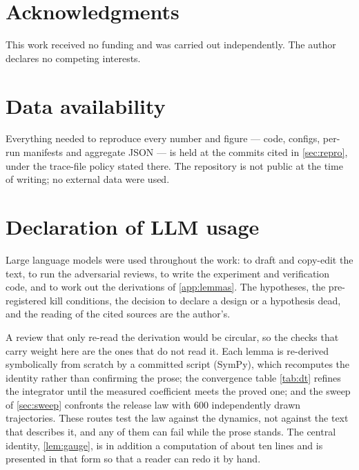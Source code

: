 \documentclass[11pt]{article}
\theoremstyle{definition}
\theoremstyle{remark}
\begin{document}
\section*{Acknowledgments}
This work received no funding and was carried out independently. The author
declares no competing interests.

\section*{Data availability}
Everything needed to reproduce every number and figure --- code, configs,
per-run manifests and aggregate JSON --- is held at the commits cited in
\cref{sec:repro}, under the trace-file policy stated there. The repository is
not public at the time of writing; no external data were used.

\section*{Declaration of LLM usage} Large language models were used throughout
the work: to draft and copy-edit the text, to run the adversarial reviews, to
write the experiment and verification code, and to work out the derivations of
\cref{app:lemmas}. The hypotheses, the pre-registered kill conditions, the
decision to declare a design or a hypothesis dead, and the reading of the
cited sources are the author's.

A review that only re-read the derivation would be circular, so the checks
that carry weight here are the ones that do not read it. Each lemma is
re-derived symbolically from scratch by a committed script (SymPy), which
recomputes the identity rather than confirming the prose; the convergence
table \cref{tab:dt} refines the integrator until the measured coefficient
meets the proved one; and the sweep of \cref{sec:sweep} confronts the release
law with 600 independently drawn trajectories. These routes test the law
against the dynamics, not against the text that describes it, and any of them
can fail while the prose stands. The central identity, \cref{lem:gauge}, is in
addition a computation of about ten lines and is presented in that form so
that a reader can redo it by hand.
\end{document}
